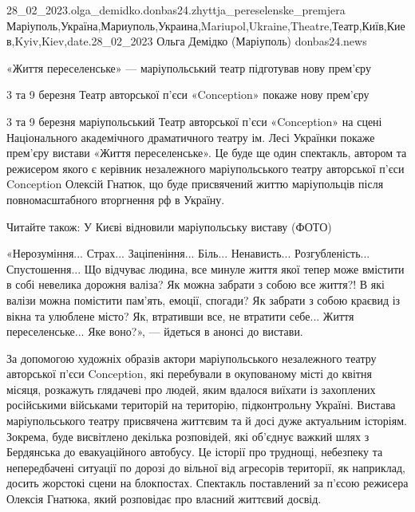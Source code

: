  
 
 
 
 

28_02_2023.olga_demidko.donbas24.zhyttja_pereselenske_premjera
Маріуполь,Україна,Мариуполь,Украина,Mariupol,Ukraine,Theatre,Театр,Київ,Киев,Kyiv,Kiev,date.28_02_2023
Ольга Демідко (Маріуполь)
donbas24.news

«Життя переселенське» — маріупольський театр підготував нову прем'єру

3 та 9 березня Театр авторської п'єси «Conception» покаже нову прем'єру

3 та 9 березня маріупольський Театр авторської п'єси «Conception» на сцені
Національного академічного драматичного театру ім. Лесі Українки покаже
прем'єру вистави «Життя переселенське». Це буде ще один спектакль, автором та
режисером якого є керівник незалежного маріупольського театру авторської п'єси
Conception Олексій Гнатюк, що буде присвячений життю маріупольців після
повномасштабного вторгнення рф в Україну.

Читайте також: У Києві відновили маріупольську виставу (ФОТО)

«Нерозуміння... Страх... Заціпеніння... Біль... Ненависть... Розгубленість... Спустошення...
Що відчуває людина, все минуле життя якої тепер може вмістити в собі невелика
дорожня валіза? Як можна забрати з собою все життя?! В які валізи можна
помістити пам'ять, емоції, спогади? Як забрати з собою краєвид із вікна та
улюблене місто? Як, втративши все, не втратити себе... Життя переселенське... Яке
воно?», — йдеться в анонсі до вистави.

За допомогою художніх образів актори маріупольського незалежного театру
авторської п'єси Conception, які перебували в окупованому місті до квітня
місяця, розкажуть глядачеві про людей, яким вдалося виїхати із захоплених
російськими військами територій на територію, підконтрольну Україні. Вистава
маріупольського театру присвячена життєвим та й досі дуже актуальним історіям.
Зокрема, буде висвітлено декілька розповідей, які об'єднує важкий шлях з
Бердянська до евакуаційного автобусу. Це історії про труднощі, небезпеку та
непередбачені ситуації по дорозі до вільної від агресорів території, як
наприклад, досить жорстокі сцени на блокпостах. Спектакль поставлений за п'єсою
режисера Олексія Гнатюка, який розповідає про власний життєвий досвід.

